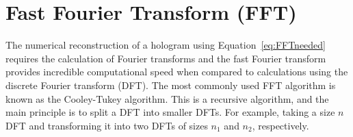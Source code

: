 %
%
%
%
%
%
%
%

    \section{Fast Fourier Transform (FFT) \label{sect:FFT}}

    The numerical reconstruction of a hologram using Equation~\ref{eq:FFTneeded}
    requires the calculation of Fourier transforms and the fast Fourier
    transform provides incredible computational speed when compared to
    calculations using the discrete Fourier transform (DFT).
%
%
        The most commonly used FFT algorithm is known as the Cooley-Tukey algorithm.
        This is a recursive algorithm, and 
        the main principle is to split a DFT into smaller DFTs.
        For example, taking a size $n$ DFT and transforming it into
        two DFTs of sizes $n_1$ and $n_2$, respectively.


